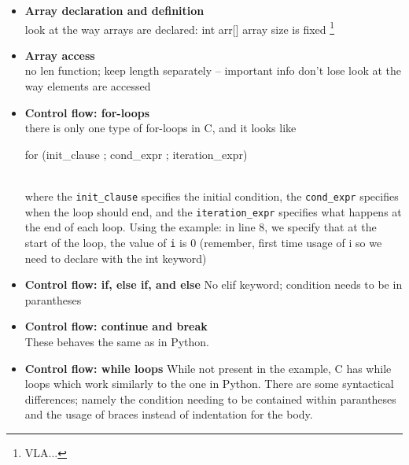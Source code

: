 \begin{itemize}
    \item \textbf{Array declaration and definition} \\
    look at the way arrays are declared: int arr[]
    array size is fixed \footnote{VLA...}
    \item \textbf{Array access} \\
    no len function; keep length separately -- important info don't lose
    look at the way elements are accessed
    \item \textbf{Control flow: for-loops} \\
    there is only one type of for-loops in C, and it looks like \\
    \begin{typewriter}
        for (init\_clause ; cond\_expr ; iteration\_expr)
    \end{typewriter} \\
    where the \verb|init_clause| specifies the initial condition, the \verb|cond_expr| specifies when the loop should end, and the \verb|iteration_expr| specifies what happens at the end of each loop. Using the example: in line 8, we specify that at the start of the loop, the value of \verb|i| is 0 (remember, first time usage of i so we need to declare with the int keyword)
    \item \textbf{Control flow: if, else if, and else}
    No elif keyword; condition needs to be in parantheses
    \item \textbf{Control flow: continue and break} \\
    These behaves the same as in Python. 
    \item \textbf{Control flow: while loops}
    While not present in the example, C has while loops which work similarly to the one in Python. There are some syntactical differences; namely the condition needing to be contained within parantheses and the usage of braces instead of indentation for the body.
\end{itemize}